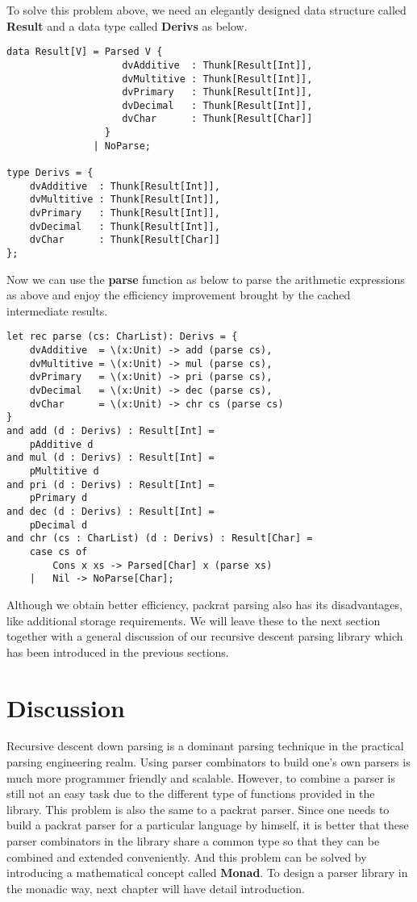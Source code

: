 To solve this problem above, we need an elegantly designed data structure called \textbf{Result} and a data type called \textbf{Derivs} as below.
\begin{lstlisting}
data Result[V] = Parsed V {
					dvAdditive	: Thunk[Result[Int]],
					dvMultitive	: Thunk[Result[Int]],
					dvPrimary	: Thunk[Result[Int]],
					dvDecimal	: Thunk[Result[Int]],
					dvChar		: Thunk[Result[Char]]
				 }
			   | NoParse;

type Derivs = {
	dvAdditive	: Thunk[Result[Int]],
	dvMultitive	: Thunk[Result[Int]],
	dvPrimary	: Thunk[Result[Int]],
	dvDecimal	: Thunk[Result[Int]],
	dvChar		: Thunk[Result[Char]]
};
\end{lstlisting}
Now we can use the \textbf{parse} function as below to parse the arithmetic expressions as above and enjoy the efficiency improvement brought by the cached intermediate results.
\begin{lstlisting}
let rec parse (cs: CharList): Derivs = {
	dvAdditive 	= \(x:Unit) -> add (parse cs),
	dvMultitive = \(x:Unit) -> mul (parse cs),
	dvPrimary 	= \(x:Unit) -> pri (parse cs),
	dvDecimal 	= \(x:Unit) -> dec (parse cs),
	dvChar 		= \(x:Unit) -> chr cs (parse cs)
}
and add (d : Derivs) : Result[Int] =
	pAdditive d
and mul (d : Derivs) : Result[Int] =
	pMultitive d
and pri (d : Derivs) : Result[Int] =
	pPrimary d
and dec (d : Derivs) : Result[Int] =
	pDecimal d
and chr (cs : CharList) (d : Derivs) : Result[Char] =
	case cs of 
		Cons x xs -> Parsed[Char] x (parse xs)
	| 	Nil -> NoParse[Char];
\end{lstlisting}
Although we obtain better efficiency, packrat parsing also has its disadvantages, like additional storage requirements. We will leave these to the next section together with a general discussion of our recursive descent parsing library which has been introduced in the previous sections.

\section{Discussion}
Recursive descent down parsing is a dominant parsing technique in the practical parsing engineering realm. Using parser combinators to build one's own parsers is much more programmer friendly and scalable. However, to combine a parser is still not an easy task due to the different type of functions provided in the library. This problem is also the same to a packrat parser. Since one needs to build a packrat parser for a particular language by himself, it is better that these parser combinators in the library share a common type so that they can be combined and extended conveniently. And this problem can be solved by introducing a mathematical concept called \textbf{Monad}. To design a parser library in the monadic way, next chapter will have detail introduction. 